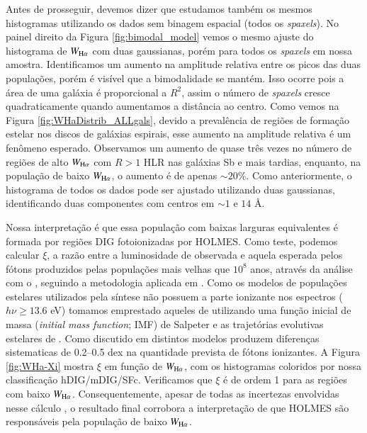 
Antes de prosseguir, devemos dizer que estudamos também os mesmos histogramas utilizando os dados sem binagem espacial (todos os {\em spaxels}). No painel direito da Figura \ref{fig:bimodal_model} vemos o mesmo ajuste do histograma de $W_{\Ha}$ com duas gaussianas, porém para todos os {\em spaxels} em nossa amostra. Identificamos um aumento na amplitude relativa entre os picos das duas populações, porém é visível que a bimodalidade se mantém. Isso ocorre pois a área de uma galáxia é proporcional a $R^2$, assim o número de {\em spaxels} cresce quadraticamente quando aumentamos a distância ao centro. Como vemos na Figura \ref{fig:WHaDistrib_ALLgals}, devido a prevalência de regiões de formação estelar nos discos de galáxias espirais, esse aumento na amplitude relativa é um fenômeno esperado. Observamos um aumento de quase três vezes no número de regiões de alto $W_{\Ha}$ com $R > 1$ HLR nas galáxias Sb e mais tardias, enquanto, na população de baixo $W_{\Ha}$, o aumento é de apenas $\sim 20\%$. Como anteriormente, o histograma de todos os dados pode ser ajustado utilizando duas gaussianas, identificando duas componentes com centros em $\sim 1$ e $14$ \AA.




Nossa interpretação é que essa população com baixas larguras equivalentes é formada por regiões DIG fotoionizadas por HOLMES. Como teste, podemos calcular $\xi$, a razão entre a luminosidade de \Ha observada e aquela esperada pelos fótons produzidos pelas populações mais velhas que $10^8$ anos, através da análise com o \starlight, seguindo a metodologia aplicada em \citet{CidFernandes.etal.2011a}. Como os modelos de populações estelares utilizados pela síntese \citep{Gonzalezdelgado2005, Vazdekis2010} não possuem a parte ionizante nos espectros ($h\nu \ge 13.6$ eV) tomamos emprestado aqueles de \citet{Bruzual.Charlot.2003} utilizando uma função inicial de massa ({\em initial mass function}; IMF) de Salpeter e as trajetórias evolutivas estelares de \citet{Girardi2000}. Como discutido em \citet{CidFernandes.etal.2011a} distintos modelos produzem diferenças sistematicas de 0.2--0.5 dex na quantidade  prevista de fótons ionizantes. A Figura \ref{fig:WHa-Xi} mostra $\xi$ em função de $W_{\Ha}$, com os histogramas coloridos por nossa classificação hDIG/mDIG/SFc. Verificamos que $\xi$ é de ordem 1 para as regiões com baixo $W_{\Ha}$. Consequentemente, apesar de todas as incertezas envolvidas nesse cálculo \citep{CidFernandes.etal.2011a, Belfiore.etal.2016, Morisset.etal.2016}, o resultado final corrobora a interpretação de que HOLMES são responsáveis pela população de baixo $W_{\Ha}$.

